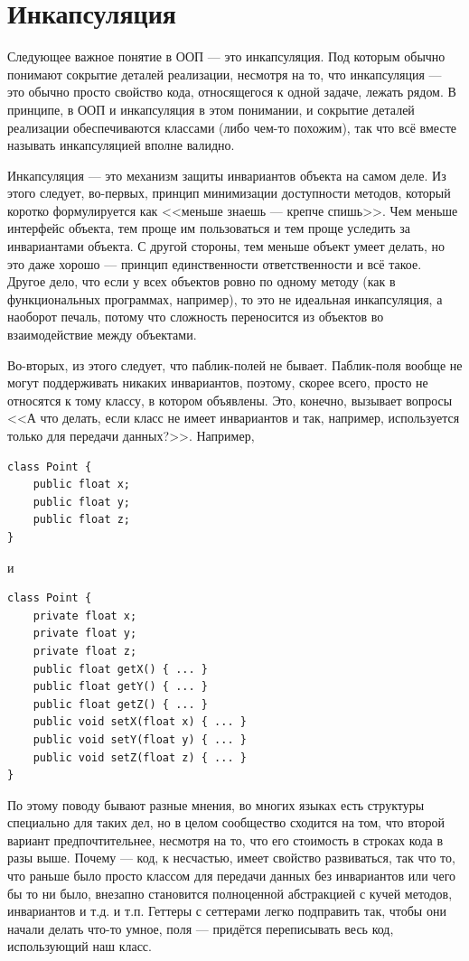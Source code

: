\documentclass[a5paper]{article}
\begin{document}
\section{Инкапсуляция}

Следующее важное понятие в ООП --- это инкапсуляция. Под которым обычно понимают сокрытие деталей реализации, несмотря на то, что инкапсуляция --- это обычно просто свойство кода, относящегося к одной задаче, лежать рядом. В принципе, в ООП и инкапсуляция в этом понимании, и сокрытие деталей реализации обеспечиваются классами (либо чем-то похожим), так что всё вместе называть инкапсуляцией вполне валидно.

Инкапсуляция --- это механизм защиты инвариантов объекта на самом деле. Из этого следует, во-первых, принцип минимизации доступности методов, который коротко формулируется как <<меньше знаешь --- крепче спишь>>. Чем меньше интерфейс объекта, тем проще им пользоваться и тем проще уследить за инвариантами объекта. С другой стороны, тем меньше объект умеет делать, но это даже хорошо --- принцип единственности ответственности и всё такое. Другое дело, что если у всех объектов ровно по одному методу (как в функциональных программах, например), то это не идеальная инкапсуляция, а наоборот печаль, потому что сложность переносится из объектов во взаимодействие между объектами.

Во-вторых, из этого следует, что паблик-полей не бывает. Паблик-поля вообще не могут поддерживать никаких инвариантов, поэтому, скорее всего, просто не относятся к тому классу, в котором объявлены. Это, конечно, вызывает вопросы <<А что делать, если класс не имеет инвариантов и так, например, используется только для передачи данных?>>. Например,

\begin{verbatim}
class Point {
    public float x;
    public float y;
    public float z;
}
\end{verbatim}

и

\begin{verbatim}
class Point {
    private float x;
    private float y;
    private float z;
    public float getX() { ... }
    public float getY() { ... }
    public float getZ() { ... }
    public void setX(float x) { ... }
    public void setY(float y) { ... }
    public void setZ(float z) { ... }
}
\end{verbatim}

По этому поводу бывают разные мнения, во многих языках есть структуры специально для таких дел, но в целом сообщество сходится на том, что второй вариант предпочтительнее, несмотря на то, что его стоимость в строках кода в разы выше. Почему --- код, к несчастью, имеет свойство развиваться, так что то, что раньше было просто классом для передачи данных без инвариантов или чего бы то ни было, внезапно становится полноценной абстракцией с кучей методов, инвариантов и т.д. и т.п. Геттеры с сеттерами легко подправить так, чтобы они начали делать что-то умное, поля --- придётся переписывать весь код, использующий наш класс.
\end{document}

